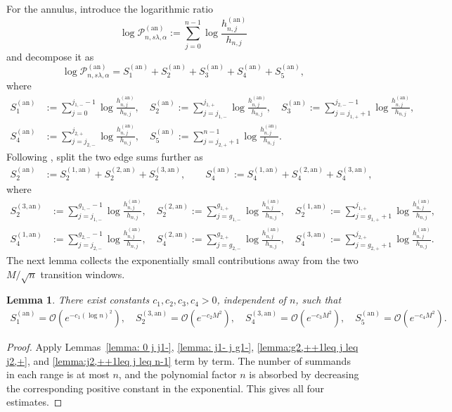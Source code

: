 \documentclass[a4paper]{article}
\newtheorem{lemma}[theorem]{Lemma}
\numberwithin{equation}{section}
\begin{document}
For the annulus, introduce the logarithmic ratio
\begin{equation}\label{def of calPns C}
    \log\mathcal{P}_{n,s\lambda,\alpha}^{(\mathrm{an})}:=
    \sum_{j=0}^{n-1}\log\frac{h_{n,j}^{(\mathrm{an})}}{h_{n,j}}
\end{equation}
and decompose it as
\[
\log\mathcal{P}_{n,s\lambda,\alpha}^{(\mathrm{an})}
=S_1^{(\mathrm{an})}+S_2^{(\mathrm{an})}+S_3^{(\mathrm{an})}+S_4^{(\mathrm{an})}+S_5^{(\mathrm{an})},
\]
where 
\begin{align*}
S_1^{(\mathrm{an})}&:=\sum_{j=0}^{j_{1,-}-1}\log\frac{h_{n,j}^{(\mathrm{an})}}{h_{n,j}}, \quad   
S_2^{(\mathrm{an})}:=\sum_{j=j_{1,-}}^{j_{1,+}}\log\frac{h_{n,j}^{(\mathrm{an})}}{h_{n,j}}, \quad
S_3^{(\mathrm{an})}:=\sum_{j=j_{1,+}+1}^{j_{2,-}-1}\log\frac{h_{n,j}^{(\mathrm{an})}}{h_{n,j}},
\\
S_4^{(\mathrm{an})}&:=\sum_{j=j_{2,-}}^{j_{2,+}}\log\frac{h_{n,j}^{(\mathrm{an})}}{h_{n,j}}, \quad
S_5^{(\mathrm{an})}:=\sum_{j=j_{2,+}+1}^{n-1}\log\frac{h_{n,j}^{(\mathrm{an})}}{h_{n,j}}.
\end{align*}
Following \cite[Eq.~(3.40)]{C2021}, split the two edge sums further as
\begin{align*}
S_2^{(\mathrm{an})}&:=S_2^{(1,\mathrm{an})}+S_2^{(2,\mathrm{an})}+S_2^{(3,\mathrm{an})},\qquad
S_4^{(\mathrm{an})}:=S_4^{(1,\mathrm{an})}+S_4^{(2,\mathrm{an})}+S_4^{(3,\mathrm{an})},
\end{align*}
where 
\begin{align*}
S_{2}^{(3,\mathrm{an})}&:=\sum_{j=j_{1,-}}^{g_{1,-}-1}\log\frac{h_{n,j}^{(\mathrm{an})}}{h_{n,j}},\quad
S_{2}^{(2,\mathrm{an})}:=\sum_{j=g_{1,-}}^{g_{1,+}}\log\frac{h_{n,j}^{(\mathrm{an})}}{h_{n,j}},\quad
S_{2}^{(1,\mathrm{an})}:=\sum_{j=g_{1,+}+1}^{j_{1,+}}\log\frac{h_{n,j}^{(\mathrm{an})}}{h_{n,j}},\\
S_4^{(1,\mathrm{an})}&:=\sum_{j=j_{2,-}}^{g_{2,-}-1}\log\frac{h_{n,j}^{(\mathrm{an})}}{h_{n,j}},\quad
S_4^{(2,\mathrm{an})}:=\sum_{j=g_{2,-}}^{g_{2,+}}\log\frac{h_{n,j}^{(\mathrm{an})}}{h_{n,j}},\quad
S_4^{(3,\mathrm{an})}:=\sum_{j=g_{2,+}+1}^{j_{2,+}}\log\frac{h_{n,j}^{(\mathrm{an})}}{h_{n,j}}.
\end{align*}
The next lemma collects the exponentially small contributions away from the two $M/\sqrt n$ transition windows.
\begin{lemma}
\label{lemma: S1245 an error}
There exist constants $c_1,c_2,c_3,c_4>0$, independent of $n$, such that
\begin{align*}
S_1^{(\mathrm{an})}=\mathcal{O}(e^{-c_1(\log n)^2}),\quad
S_2^{(3,\mathrm{an})}=\mathcal{O}(e^{-c_2M^2}),\quad
S_4^{(3,\mathrm{an})}=\mathcal{O}(e^{-c_3M^2}),\quad
S_5^{(\mathrm{an})}=\mathcal{O}(e^{-c_4M^2}).
\end{align*}
\end{lemma}
\begin{proof}
Apply Lemmas~\ref{lemma: 0 j j1-}, \ref{lemma: j1- j g1-}, \ref{lemma:g2,++1leq j leq j2,+}, and \ref{lemma:j2,++1leq j leq n-1} term by term. The number of summands in each range is at most $n$, and the polynomial factor $n$ is absorbed by decreasing the corresponding positive constant in the exponential. This gives all four estimates.
\end{proof}
\end{document}
